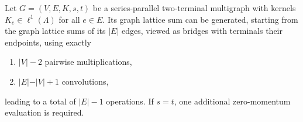 \documentclass[]{amsart}
\numberwithin{mythm}{section}
\begin{document}
\begin{theorem}
\label{thm:tw2_zeta}
Let $G=(V,E,K,s,t)$ be a series-parallel two-terminal multigraph with kernels
$K_e\in\ell^1(\Lambda)$ for all $e\in E$. Its graph lattice sum
can be generated, starting from the graph lattice sums of its $\vert E\vert$
edges, viewed as bridges with terminals their endpoints, using exactly
\begin{enumerate}
    \item $\vert V\vert-2$ pairwise multiplications,
    \item $\vert E\vert-\vert V\vert+1$ convolutions,
\end{enumerate}
leading to a total of $\vert E\vert-1$ operations. If $s=t$, one additional zero-momentum evaluation is required.
\end{theorem}
\end{document}
